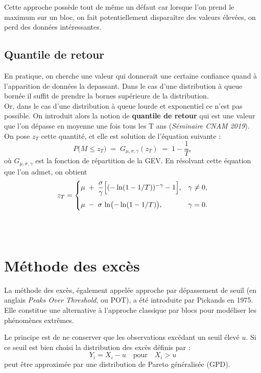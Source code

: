 \documentclass{article}
\theoremstyle{plain}
\theoremstyle{definition}
\theoremstyle{plain}
\begin{document}
\noindent Cette approche possède tout de même un défaut car lorsque l'on prend le maximum sur un bloc, on fait potentiellement disparaître des valeurs élevées, on perd des données intéressantes.

\subsection{Quantile de retour}

\noindent En pratique, on cherche une valeur qui donnerait une certaine confiance quand à l'apparition
de données la depassant. Dans le cas d'une distribution à queue bornée il suffit de prendre la bornes supérieure de la distribution.
\\
Or, dans le cas d'une distribution à queue lourde et exponentiel ce n'est pas possible. On introduit alors la notion de \textbf{quantile de retour} qui est une valeur que l'on dépasse en moyenne une fois tous les T ans (\textit{Séminaire CNAM 2019}).
\\
On pose $z_T$ cette quantité, et elle est solution de l'équation suivante :
\[
P\bigl(M \le z_T\bigr)
\;=\;
G_{\mu,\sigma,\gamma}(z_T)
\;=\;
1 - \frac{1}{T},
\]
où \(G_{\mu,\sigma,\gamma}\) est la fonction de répartition de la GEV. En résolvant cette équation que l'on admet, on obtient
\[
z_T =
\begin{cases}
\displaystyle
\mu \;+\;\frac{\sigma}{\gamma}\Bigl[(-\ln(1 - 1/T))^{-\gamma} - 1\Bigr],
&\gamma \neq 0,\\[1em]
\displaystyle
\mu \;-\;\sigma\,\ln\bigl(-\ln(1 - 1/T)\bigr),
&\gamma = 0.
\end{cases}
\]
\\
\\
\section{Méthode des excès}

\noindent La méthode des excès, également appelée approche par dépassement de seuil (en anglais \textit{Peaks Over Threshold}, ou POT), a été introduite par Pickands en 1975. Elle constitue une alternative à l’approche classique par blocs pour modéliser les phénomènes extrêmes.

\noindent Le principe est de ne conserver que les observations excédant un seuil élevé \( u \). Si ce seuil est bien choisi la distribution des excès définis par :
\[
Y_i = X_i - u \quad \text{pour} \quad X_i > u
\]
peut être approximée par une distribution de Pareto généralisée (GPD).
\end{document}
